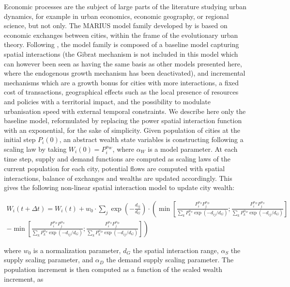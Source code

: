 \documentclass[10pt,letterpaper]{article}
\begin{document}
Economic processes are the subject of large parts of the literature studying urban dynamics, for example in urban economics, economic geography, or regional science, but not only. The MARIUS model family developed by \citep{cottineau2014evolution} is based on economic exchanges between cities, within the frame of the evolutionary urban theory. Following \citep{cottineau2015modular}, the model family is composed of a baseline model capturing spatial interactions (the Gibrat mechanism is not included in this model which can however been seen as having the same basis as other models presented here, where the endogenous growth mechanism has been deactivated), and incremental mechanisms which are a growth bonus for cities with more interactions, a fixed cost of transactions, geographical effects such as the local presence of resources and policies with a territorial impact, and the possibility to modulate urbanisation speed with external temporal constraints. We describe here only the baseline model, reformulated by replacing the power spatial interaction function with an exponential, for the sake of simplicity. Given population of cities at the initial step $P_i(0)$, an abstract wealth state variables is constructing following a scaling law by taking $W_i(0)=P_i^{\alpha_W}$, where $\alpha_W$ is a model parameter. At each time step, supply and demand functions are computed as scaling laws of the current population for each city, potential flows are computed with spatial interactions, balance of exchanges and wealths are updated accordingly. This gives the following non-linear spatial interaction model to update city wealth:

\begin{multline}
	W_i (t + \Delta t) = W_i (t) + w_0 \cdot \sum_j \exp \left( - \frac{d_{ij}}{d_G} \right)	\cdot \left( \min \left[ \frac{P_i^{\alpha_S} P_j^{\alpha_D}}{\sum_k P_k^{\alpha_S} \exp(-d_{ij}/d_G)} ; \frac{P_i^{\alpha_D} P_j^{\alpha_S}}{\sum_k P_k^{\alpha_D} \exp(-d_{ij}/d_G)} \right]\right. \\ \left. - \min \left[ \frac{P_i^{\alpha_D} P_j^{\alpha_S}}{\sum_k P_k^{\alpha_S} \exp(-d_{ij}/d_G)} ; \frac{P_i^{\alpha_S} P_j^{\alpha_D}}{\sum_k P_k^{\alpha_D} \exp(-d_{ij}/d_G)} \right] \right)
\end{multline}

where $w_0$ is a normalization parameter, $d_G$ the spatial interaction range, $\alpha_S$ the supply scaling parameter, and $\alpha_D$ the demand supply scaling parameter. The population increment is then computed as a function of the scaled wealth increment, as
\end{document}
